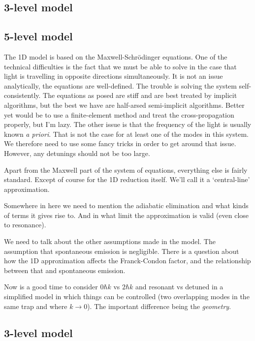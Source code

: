 \subsection{3-level model}

\subsection{5-level model}
The 1D model is based on the Maxwell-Schrödinger equations.  One of the technical difficulties is the fact that we must be able to solve in the case that light is travelling in opposite directions simultaneously.  It is not an issue analytically, the equations are well-defined.  The trouble is solving the system self-consistently.  The equations as posed are stiff and are best treated by implicit algorithms, but the best we have are half-arsed semi-implicit algorithms. Better yet would be to use a finite-element method and treat the cross-propagation properly, but I'm lazy.  The other issue is that the frequency of the light is usually known \emph{a priori}.  That is not the case for at least one of the modes in this system.  We therefore need to use some fancy tricks in order to get around that issue.  However, any detunings should not be too large.

Apart from the Maxwell part of the system of equations, everything else is fairly standard.  Except of course for the 1D reduction itself.  We'll call it a `central-line' approximation.

Somewhere in here we need to mention the adiabatic elimination and what kinds of terms it gives rise to.  And in what limit the approximation is valid (even close to resonance).

We need to talk about the other assumptions made in the model.  The assumption that spontaneous emission is negligible.  There is a question about how the 1D approximation affects the Franck-Condon factor, and the relationship between that and spontaneous emission.

Now is a good time to consider $0 \hbar k$ vs $2 \hbar k$ and resonant vs detuned in a simplified model in which things can be controlled (two overlapping modes in the same trap and where $k \rightarrow 0$). The important difference being the \emph{geometry}.

\subsection{3-level model}

